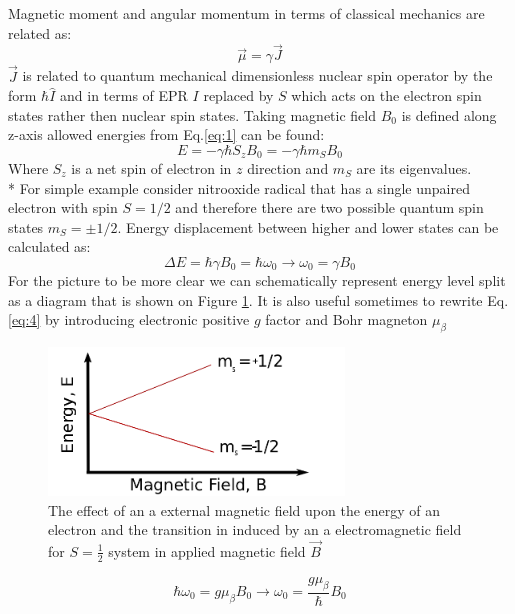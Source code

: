 Magnetic moment and angular momentum in terms of classical mechanics are related as: 
\begin{equation}\label{eq:2}
\vec{\mu}=\gamma \vec{J}
\end{equation}
$\vec{J}$ is related to quantum mechanical dimensionless nuclear spin operator by the form $\hbar\hat{I}$ and in terms of EPR $I$ replaced by $S$ which acts on the electron spin states rather then nuclear spin states. Taking magnetic field $B_0$ is defined along z-axis allowed energies from Eq.\ref{eq:1} can be found:
\begin{equation}\label{eq:3}
E=-\gamma\hbar S_z B_0=-\gamma\hbar m_S B_0
\end{equation} 
Where $S_z$ is a net spin of electron in $z$ direction and $m_S$ are its eigenvalues. \\*
For simple example consider nitrooxide radical that has a single unpaired electron with spin $S=1/2$ and therefore there are two possible quantum spin states $m_S=\pm1/2$. Energy displacement between higher and lower states can be calculated as:
\begin{equation}\label{eq:4}
\Delta E=\hbar \gamma B_0=\hbar \omega_0 \rightarrow \omega_0=\gamma B_0
\end{equation} 
For the picture to be more clear we can schematically represent energy level split as a diagram that is shown on Figure \ref{figure:zeeman}. It is also useful sometimes to rewrite Eq.\ref{eq:4} by introducing electronic positive $g$ factor and Bohr magneton $\mu_{\beta}$  
\begin{figure}[h!]
\begin{center}
\includegraphics[width=0.7\textwidth]{figures/chap1/zems.png}
\caption{The effect of an a external magnetic field upon the energy of an electron and
the transition in induced by an a electromagnetic field for $S=\frac{1}{2}$ system in applied magnetic field $\vec B$}
\label{figure:zeeman}
\end{center}
\end{figure}
\begin{equation}\label{eq:5}
\hbar \omega_0=g\mu_{\beta}B_0 \rightarrow \omega_0=\frac{g\mu_{\beta}}{\hbar}B_0
\end{equation} 
